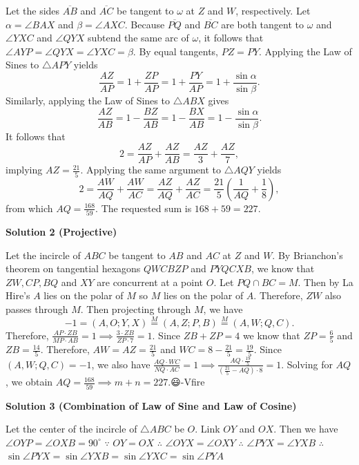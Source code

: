 \begin{enumerate}
Let the sides $\overline{AB}$ and $\overline{AC}$ be tangent to $\omega$ at $Z$ and $W$, respectively. Let $\alpha = \angle BAX$ and $\beta = \angle AXC$. Because $\overline{PQ}$ and $\overline{BC}$ are both tangent to $\omega$ and $\angle YXC$ and $\angle QYX$ subtend the same arc of $\omega$, it follows that $\angle AYP = \angle QYX = \angle YXC = \beta$. By equal tangents, $PZ = PY$. Applying the Law of Sines to $\triangle APY$ yields 
 \[\frac{AZ}{AP} = 1 + \frac{ZP}{AP} = 1 + \frac{PY}{AP} = 1 + \frac{\sin\alpha}{\sin\beta}.\]Similarly, applying the Law of Sines to $\triangle ABX$ gives 
 \[\frac{AZ}{AB} = 1 - \frac{BZ}{AB} = 1 - \frac{BX}{AB} = 1 - \frac{\sin\alpha}{\sin\beta}.\]It follows that 
 \[2 = \frac{AZ}{AP} + \frac{AZ}{AB} = \frac{AZ}3 + \frac{AZ}7,\]implying $AZ = \frac{21}5$. Applying the same argument to $\triangle AQY$ yields 
 \[2 = \frac{AW}{AQ} + \frac{AW}{AC} = \frac{AZ}{AQ} + \frac{AZ}{AC} = \frac{21}5\left(\frac{1}{AQ} + \frac 18\right),\]from which $AQ = \frac{168}{59}$. The requested sum is $168 + 59 = \boxed{227}$.

 



\textbf{Solution 2 (Projective)}

Let the incircle of $ABC$ be tangent to $AB$ and $AC$ at $Z$ and $W$. By Brianchon's theorem on tangential hexagons $QWCBZP$ and $PYQCXB$, we know that $ZW,CP,BQ$ and $XY$ are concurrent at a point $O$. Let $PQ \cap BC = M$. Then by La Hire's $A$ lies on the polar of $M$ so $M$ lies on the polar of $A$. Therefore, $ZW$ also passes through $M$. Then projecting through $M$, we have
 \[-1 = (A,O;Y,X) \stackrel{M}{=} (A,Z;P,B) \stackrel{M}{=} (A,W;Q,C).\]Therefore, $\frac{AP \cdot ZB}{MP \cdot AB} = 1 \implies \frac{3 \cdot ZB}{ZP \cdot 7} = 1$. Since $ZB+ZP=4$ we know that $ZP = \frac{6}{5}$ and $ZB = \frac{14}{5}$. Therefore, $AW = AZ = \frac{21}{5}$ and $WC = 8 - \frac{21}{5} = \frac{19}{5}$. Since $(A,W;Q,C) = -1$, we also have $\frac{AQ \cdot WC}{NQ \cdot AC} = 1 \implies \frac{AQ \cdot \frac{19}{5}}{(\frac{21}{5} - AQ) \cdot 8} = 1$. Solving for $AQ$, we obtain $AQ = \frac{168}{59} \implies m+n = \boxed{227}$.😃-Vfire

 



\textbf{Solution 3  (Combination of Law of Sine and Law of Cosine)}

Let the center of the incircle of $\triangle ABC$ be $O$. Link $OY$ and $OX$. Then we have $\angle OYP=\angle OXB=90^{\circ}$
$\because$ $OY=OX$
$\therefore$ $\angle OYX=\angle OXY$
$\therefore$ $\angle PYX=\angle YXB$
$\therefore$ $\sin \angle PYX=\sin \angle YXB=\sin \angle YXC=\sin \angle PYA$


\end{enumerate}
